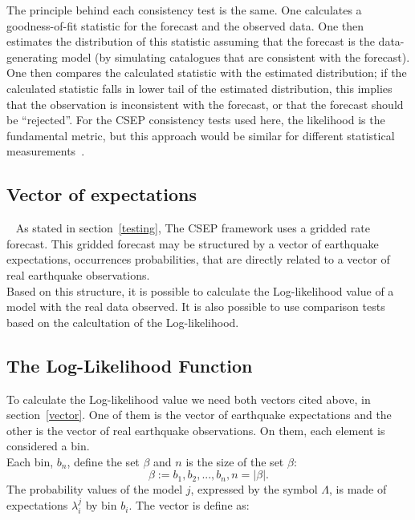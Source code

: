 The principle behind each consistency test is the same. One calculates a goodness-of-fit statistic for the forecast and the observed data. One then estimates the distribution of
this statistic assuming that the forecast is the data-generating model (by simulating catalogues that are consistent with the forecast). One then compares the calculated statistic with the estimated distribution; if the calculated statistic falls in lower tail of the estimated distribution, this implies that the observation is inconsistent with the forecast, or that the forecast should be “rejected”. For the CSEP consistency tests used here, the likelihood is the fundamental metric, but this approach would be similar for different statistical measurements~\cite{eberhard2014multiscale}.\\

\subsection{Vector of expectations}~\label{vector}
As stated in section~\ref{testing}, The CSEP framework uses a gridded rate forecast. This gridded forecast may be structured by a vector of earthquake expectations, occurrences probabilities, that are directly related to a vector of real earthquake observations.\\

Based on this structure, it is possible to calculate the Log-likelihood value of a model with the real data observed. It is also possible to use comparison tests based on the calcultation of the Log-likelihood.\\

\subsection{The Log-Likelihood Function}\label{log-fuction}
To calculate the Log-likelihood value we need both vectors cited above, in section~\ref{vector}. One of them is the vector of earthquake expectations and the other is the vector of real earthquake observations. On them, each element is considered a bin. \\

Each bin, $b_n$, define the set $\beta$ and $n$ is the size of the set $\beta$:
\begin{equation} 
\beta := {b_1,b_2,...,b_n},n = |\beta|.
\end{equation}
The probability values of the model $j$, expressed by the symbol
$\Lambda$, is made of expectations $\lambda_i^j$ by bin $b_i$. The
vector is define as:
				
